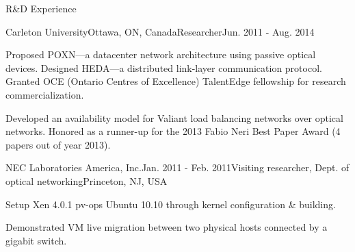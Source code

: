 \documentclass{resume} %
\begin{document}
\begin{rSection}{R\&D Experience}

\begin{rSubsection}{Carleton University}{Ottawa, ON, Canada}{Researcher}{Jun. 2011 - Aug. 2014}
\item Proposed POXN---a datacenter network architecture using passive optical devices. Designed HEDA---a distributed link-layer communication protocol. Granted OCE (Ontario Centres of Excellence) TalentEdge fellowship for research commercialization. %
\item Developed an availability model for Valiant load balancing networks over optical networks. Honored as a runner-up for the 2013 Fabio Neri Best Paper Award (4 papers out of year 2013).
\end{rSubsection}


\begin{rSubsection}{NEC Laboratories America, Inc.}{Jan. 2011 - Feb. 2011}{Visiting researcher, Dept. of optical networking}{Princeton, NJ, USA}
\item Setup Xen 4.0.1 pv-ops Ubuntu 10.10 through kernel configuration \& building. 
\item Demonstrated VM live migration between two physical hosts connected by a gigabit switch.
\end{rSubsection}

\end{rSection}



\end{document}
